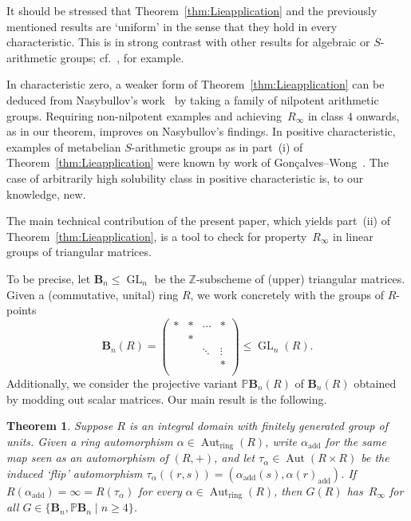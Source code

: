 \documentclass[a4paper,11pt]{amsart}
\numberwithin{equation}{section}
\theoremstyle{plain}
\newtheorem{thm}{Theorem}[section]
\theoremstyle{definition}
\newcommand{\Z}{\mathbb{Z}}
\newcommand{\anel}[1]{#1_{\text{ring}}} %
\newcommand{\addi}[1]{#1_{\text{add}}} %
\DeclareMathOperator{\GL}{GL} %
\newcommand{\mbB}{\mathbf{B}} %
\newcommand{\PB}{\mathbb{P}\mathbf{B}} %
\newcommand{\Ri}{R_{\infty}} %
\DeclareMathOperator{\Aut}{Aut}
\begin{document}
It should be stressed that Theorem~\ref{thm:Lieapplication} and the previously mentioned results are `uniform' in the sense that they hold in every characteristic. This is in strong contrast with other results for algebraic or $S$-arithmetic groups; cf.~\cite{LitterickThomasCRgood,Tiemeyer,Bux04}, for example. 

In characteristic zero, a weaker form of Theorem~\ref{thm:Lieapplication} can be deduced from Nasybullov's work~\cite{TimurUniTri} by taking a family of nilpotent arithmetic groups. Requiring non-nilpotent examples and achieving~$\Ri$ in class $4$ onwards, as in our theorem, improves on Nasybullov's findings. In positive characteristic, examples of metabelian $S$-arithmetic groups as in part~(i) of Theorem~\ref{thm:Lieapplication} were known by work of Gon\c{c}alves--Wong~\cite{DacibergWongWreath}. The case of arbitrarily high solubility class in positive characteristic is, to our knowledge, new. 

The main technical contribution of the present paper, which yields part~(ii) of Theorem~\ref{thm:Lieapplication},  
is a tool to check for property~$\Ri$ in linear groups of triangular matrices.

To be precise, let $\mbB_n \leq \GL_n$ be the $\Z$-subscheme of (upper) triangular matrices. Given a (commutative, unital) ring $R$, we work concretely with the groups of $R$-points 
\[ 
\mbB_n(R) = \left( \begin{smallmatrix} * & * & \cdots & * \\  & * & & \\ & & \ddots & \vdots \\ & & & * \\  \end{smallmatrix} \right) \leq \GL_n(R).
\]
Additionally, we consider the projective variant $\PB_n(R)$ of $\mbB_n(R)$ obtained by modding out scalar matrices. Our main result is the following.

\begin{thm} \label{thm:Additive}
Suppose $R$ is an integral domain with finitely generated group of units. Given a ring automorphism $\alpha \in \anel{\Aut}(R)$, write $\addi{\alpha}$ for the same map seen as an automorphism of $(R,+)$, and let $\tau_\alpha \in \Aut( R\times R)$ be the induced `flip' automorphism $\tau_\alpha((r,s)) = (\addi{\alpha}(s),\addi{\alpha(r)})$. If $R(\addi{\alpha}) = \infty = R(\tau_\alpha)$ for every $\alpha \in \anel{\Aut}(R)$, then $G(R)$ has~$\Ri$ for all $G \in \{ \mbB_n, \PB_n \mid n \geq 4 \}$.
\end{thm}
\end{document}
